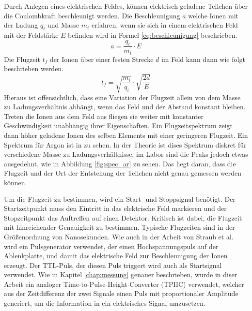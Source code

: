 Durch Anlegen eines elektrischen Feldes, können elektrisch geladene Teilchen über die Coulombkraft beschleunigt werden. Die Beschleunigung $a$ welche Ionen mit der Ladung $q_i$ und Masse $m_i$ erfahren, wenn sie sich in einem elektrischen Feld mit der Feldstärke $E$ befinden wird in Formel \ref{eq:beschleunigung} beschrieben. 
\begin{equation}
    \label{eq:beschleunigung}
    a = \frac{q_i}{m_i} \cdot E
\end{equation}
Die Flugzeit $t_f$ der Ionen über einer festen Strecke $d$ im Feld kann dann wie folgt beschrieben werden.
\begin{equation}
    t_f = \sqrt{\frac{m_i}{q_i}} \cdot \sqrt{\frac{2d}{E}}
\end{equation}
Hieraus ist offensichtlich, dass eine Variation der Flugzeit allein von dem Masse zu Ladungsverhältnis abhängt, wenn das Feld und der Abstand konstant bleiben. Treten die Ionen aus dem Feld aus fliegen sie weiter mit konstanter Geschwindigkeit unabhängig ihrer Eigenschaften. Ein Flugzeitspektrum zeigt dann höher geladene Ionen des selben Elements mit einer geringeren Flugzeit. Ein Spektrum für Argon ist in  zu sehen. In der Theorie ist dises Spektrum diskret für verschiedene Masse zu Ladungsverhältnisse, im Labor sind die Peaks jedoch etwas ausgedehnt, wie in Abbildung \ref{fig:spec_ar} zu sehen. Das liegt daran, dass die Flugzeit und der Ort der Entstehung der Teilchen nicht genau gemessen werden können.

Um die Flugzeit zu bestimmen, wird ein Start- und Stoppsignal benötigt. Der Startzeitpunkt muss den Eintritt in das elektrische Feld markieren und der Stopzeitpunkt das Auftreffen auf einen Detektor. Kritisch ist dabei, die Flugzeit mit hinreichender Genauigkeit zu bestimmen. Typische Flugzeiten sind in der Größenordnung von Nanosekunden. Wie auch in der Arbeit von Straub et al. wird ein Pulsgenerator verwendet, der einen Hochspannungspuls auf der Ablenkplatte, und damit das elektrische Feld zur Beschleunigung der Ionen erzeugt. Der TTL-Puls, der diesen Puls triggert wird auch als Startsignal verwendet. Wie in Kapitel \ref{chap:messung} genauer beschrieben, wurde in diser Arbeit ein analoger Time-to-Pulse-Height-Converter (TPHC) verwendet, welcher aus der Zeitdifferenz der zwei Signale einen Puls mit proportionaler Amplitude generiert, um die Information in ein elektrisches Signal umzusetzen.

